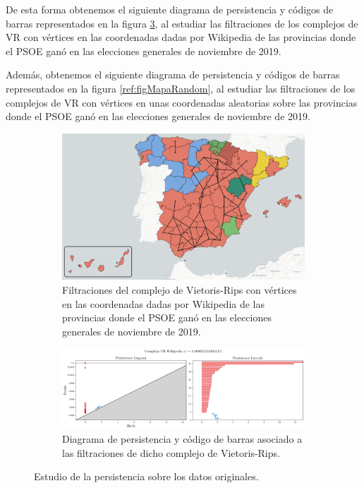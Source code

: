 De esta forma obtenemos el siguiente diagrama de persistencia y códigos de barras representados en la figura \ref{ref:figMapaWiki}, al estudiar las filtraciones de los complejos de VR con vértices en las coordenadas dadas por Wikipedia de las provincias donde el PSOE ganó en las elecciones generales de noviembre de 2019.

Además, obtenemos el siguiente diagrama de persistencia y códigos de barras representados en la figura \ref{ref:figMapaRandom}, al estudiar las filtraciones de los complejos de VR con vértices en unas coordenadas aleatorias sobre las provincias donde el PSOE ganó en las elecciones generales de noviembre de 2019.

\newpage
\vspace*{\fill}
\begin{figure}[!ht]
\centering
\begin{subfigure}[b]{\textwidth}
	\centering
	\includegraphics[width=\textwidth]{include/figuras/mapaWikipedia.png} 
	\caption{Filtraciones del complejo de Vietoris-Rips con vértices en las coordenadas dadas por Wikipedia de las provincias donde el PSOE ganó en las elecciones generales de noviembre de 2019.}
	\label{ref:mapaWiki}
\end{subfigure}
\begin{subfigure}[b]{\textwidth}
	\centering
	\includegraphics[width=\textwidth]{../code/output/ejemploMapa.png} 
	\caption{Diagrama de persistencia y código de barras asociado a las filtraciones de dicho complejo de Vietoris-Rips.}
	\label{ref:persMapaWiki}
\end{subfigure}
\caption{Estudio de la persistencia sobre los datos originales.}
\label{ref:figMapaWiki}
\end{figure} 
